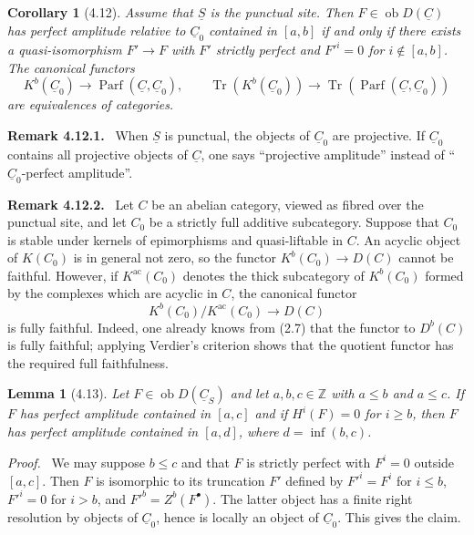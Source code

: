 \documentclass[13pt]{extarticle}
\newcommand{\ZZ}{\mathbb Z}
\newcommand{\uS}{\underline S}
\newcommand{\uC}{\underline C}
\newcommand{\Tr}{\operatorname{Tr}}
\newcommand{\ob}{\operatorname{ob}}
\newcommand{\Parf}{\operatorname{Parf}}
\newenvironment{prooftext}[1][Proof]{\par\noindent\emph{#1.}\ }{\par\medskip}
\newenvironment{remarktext}[1][Remark]{\par\noindent\textbf{#1.}\ }{\par\medskip}
\newtheorem*{lemma*}{Lemma}
\newtheorem*{corollary*}{Corollary}
\begin{document}
\begin{corollary*}[4.12]
Assume that $\uS$ is the punctual site. Then $F\in\ob D(\uC)$ has perfect amplitude relative to $\uC_0$ contained in $[a,b]$ if and only if there exists a quasi-isomorphism $F'\to F$ with $F'$ strictly perfect and $F'^i=0$ for $i\notin[a,b]$. The canonical functors
\[
K^b(\uC_0)\longrightarrow\Parf(\uC,\uC_0),
\qquad
\Tr(K^b(\uC_0))\longrightarrow\Tr(\Parf(\uC,\uC_0))
\]
are equivalences of categories.
\end{corollary*}

\begin{remarktext}[Remark 4.12.1]
When $\uS$ is punctual, the objects of $\uC_0$ are projective. If $\uC_0$ contains all projective objects of $\uC$, one says ``projective amplitude'' instead of ``$\uC_0$-perfect amplitude''.
\end{remarktext}

\begin{remarktext}[Remark 4.12.2]
Let $C$ be an abelian category, viewed as fibred over the punctual site, and let $C_0$ be a strictly full additive subcategory. Suppose that $C_0$ is stable under kernels of epimorphisms and quasi-liftable in $C$. An acyclic object of $K(C_0)$ is in general not zero, so the functor $K^b(C_0)\to D(C)$ cannot be faithful. However, if $K^{\mathrm{ac}}(C_0)$ denotes the thick subcategory of $K^b(C_0)$ formed by the complexes which are acyclic in $C$, the canonical functor
\[
K^b(C_0)/K^{\mathrm{ac}}(C_0)\longrightarrow D(C)
\]
is fully faithful. Indeed, one already knows from (2.7) that the functor to $D^b(C)$ is fully faithful; applying Verdier's criterion shows that the quotient functor has the required full faithfulness.
\end{remarktext}

\begin{lemma*}[4.13]
Let $F\in\ob D(\uC_S)$ and let $a,b,c\in\ZZ$ with $a\leq b$ and $a\leq c$. If $F$ has perfect amplitude contained in $[a,c]$ and if $H^i(F)=0$ for $i\geq b$, then $F$ has perfect amplitude contained in $[a,d]$, where $d=\inf(b,c)$.
\end{lemma*}

\begin{prooftext}
We may suppose $b\leq c$ and that $F$ is strictly perfect with $F^i=0$ outside $[a,c]$. Then $F$ is isomorphic to its truncation $F'$ defined by $F'^i=F^i$ for $i\leq b$, $F'^i=0$ for $i>b$, and $F'^b=Z^b(F^\bullet)$. The latter object has a finite right resolution by objects of $\uC_0$, hence is locally an object of $\uC_0$. This gives the claim.
\end{prooftext}
\end{document}
